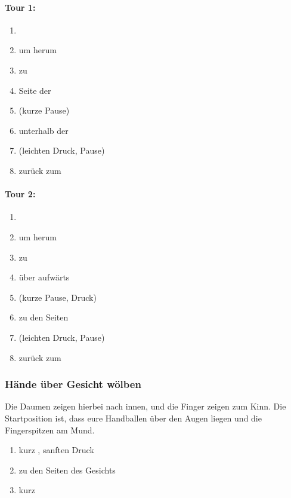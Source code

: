 \begin{multicols}{2}

\paragraph{Tour 1:}
\begin{enumerate}
	\item {}
	\item um  herum
	\item zu 
	\item Seite der 
	\item {} (kurze Pause)
	\item unterhalb der 
	\item {} (leichten Druck, Pause)
	\item zurück zum 
\end{enumerate}

\columnbreak

\paragraph{Tour 2:}
\begin{enumerate}
	\item {}
	\item um  herum
	\item zu 
	\item über  aufwärts
	\item {} (kurze Pause, Druck)
	\item {} zu den Seiten
	\item {} (leichten Druck, Pause)
	\item zurück zum 
\end{enumerate}

\end{multicols}


\subsubsection{Hände über Gesicht wölben}

Die Daumen zeigen hierbei nach innen, und die Finger zeigen zum Kinn. Die Startposition ist, dass eure Handballen über den Augen liegen und die Fingerspitzen am Mund.

\begin{enumerate}
	\item kurz , sanften Druck
	\item {} zu den Seiten des Gesichts
	\item kurz 
\end{enumerate}

